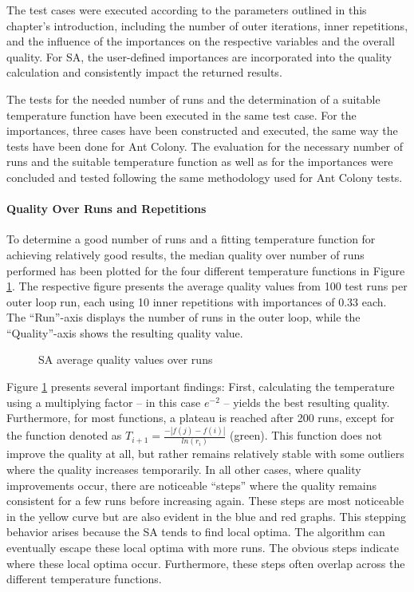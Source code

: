 The test cases were executed according to the parameters outlined in this chapter's introduction, including the number of outer iterations, inner repetitions, and the influence of the importances on the respective variables and the overall quality.
For SA, the user-defined importances are incorporated into the quality calculation and consistently impact the returned results.


The tests for the needed number of runs and the determination of a suitable temperature function have been executed in the same test case.
For the importances, three cases have been constructed and executed, the same way the tests have been done for Ant Colony.
The evaluation for the necessary number of runs and the suitable temperature function as well as for the importances were concluded and tested following the same methodology used for Ant Colony tests.


\paragraph{Quality Over Runs and Repetitions}

To determine a good number of runs and a fitting temperature function for achieving relatively good results, the median quality over number of runs performed has been plotted for the four different temperature functions in Figure \ref{fig:SAQualityRuns}.
The respective figure presents the average quality values from 100 test runs per outer loop run, each using 10 inner repetitions with importances of 0.33 each.
The \enquote{Run}-axis displays the number of runs in the outer loop, while the \enquote{Quality}-axis shows the resulting quality value.

\begin{figure}
	\makebox[\textwidth][c]{
	}
	\centering
	\caption{SA average quality values over runs}
	\label{fig:SAQualityRuns}
\end{figure}

Figure \ref{fig:SAQualityRuns} presents several important findings:
First, calculating the temperature using a multiplying factor -- in this case $e^{-2}$ -- yields the best resulting quality.
Furthermore, for most functions, a plateau is reached after 200 runs, except for the function denoted as $ T_{i+1} = \frac{- |f(j)-f(i)|}{ln(r_i)} $ (green).
This function does not improve the quality at all, but rather remains relatively stable with some outliers where the quality increases temporarily.
In all other cases, where quality improvements occur, there are noticeable \enquote{steps} where the quality remains consistent for a few runs before increasing again.
These steps are most noticeable in the yellow curve but are also evident in the blue and red graphs.
This stepping behavior arises because the SA tends to find local optima.
The algorithm can eventually escape these local optima with more runs.
The obvious steps indicate where these local optima occur.
Furthermore, these steps often overlap across the different temperature functions.



